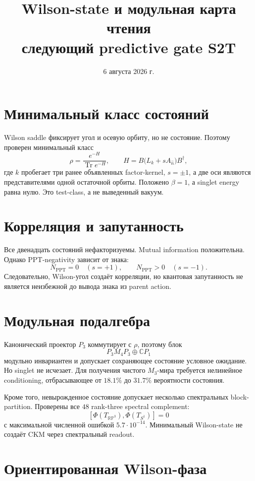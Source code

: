 \documentclass[12pt,a4paper]{article}
\title{Wilson-state и модульная карта чтения\\
следующий predictive gate S2T}
\author{}
\date{6 августа 2026 г.}
\DeclareMathOperator{\Tr}{Tr}
\begin{document}
\maketitle

\section{Минимальный класс состояний}

Wilson saddle фиксирует угол и осевую орбиту, но не состояние. Поэтому
проверен минимальный класс
\[
 \rho=\frac{e^{-H}}{\Tr e^{-H}},
 \qquad
 H=B\bigl(L_k+sA_{\hat n}\bigr)B^\dagger,
\]
где \(k\) пробегает три ранее объявленных factor-kernel, \(s=\pm1\), а две
оси являются представителями одной остаточной орбиты. Положено
\(\beta=1\), а singlet energy равна нулю. Это test-class, а не выведенный
вакуум.

\section{Корреляция и запутанность}

Все двенадцать состояний нефакторизуемы. Mutual information положительна.
Однако PPT-negativity зависит от знака:
\[
 N_{\mathrm{PPT}}=0\quad(s=+1),
\qquad
 N_{\mathrm{PPT}}>0\quad(s=-1).
\]
Следовательно, Wilson-угол создаёт корреляции, но квантовая запутанность не
является неизбежной до вывода знака из parent action.

\section{Модульная подалгебра}

Канонический проектор \(P_3\) коммутирует с \(\rho\), поэтому блок
\[
 P_3M_4P_3\oplus\mathbb CP_1
\]
модульно инвариантен и допускает сохраняющее состояние условное ожидание.
Но singlet не исчезает. Для получения чистого \(M_3\)-мира требуется
нелинейное conditioning, отбрасывающее от \(18.1\%\) до \(31.7\%\)
вероятности состояния.

Кроме того, невырожденное состояние допускает несколько спектральных
block-partition. Проверены все \(48\) rank-three spectral complement:
\[
 [\Phi(T_{\mathbb{RP}^3}),\Phi(T_{S^1})]=0
\]
с максимальной численной ошибкой \(5.7\cdot10^{-14}\). Минимальный
Wilson-state не создаёт CKM через спектральный readout.

\section{Ориентированная Wilson-фаза}
\end{document}
